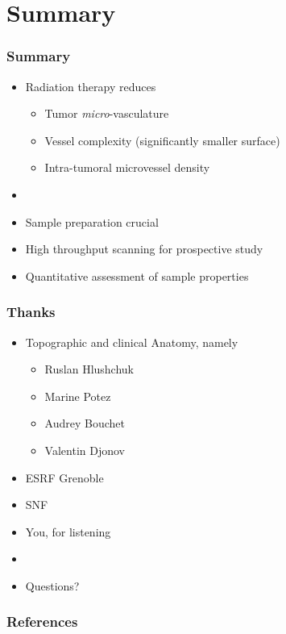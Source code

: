 \documentclass[final]{beamer}
\begin{document}
\section{Summary}
\begin{frame}
	\frametitle{Summary}
	\begin{itemize}
		\item Radiation therapy reduces
		\begin{itemize}
			\item Tumor \emph{micro}-vasculature
			\item Vessel complexity (significantly smaller surface)
			\item Intra-tumoral microvessel density
		\end{itemize}		
		\item[]
		\pause
		\item Sample preparation crucial
		\item High throughput scanning for prospective study
		\item Quantitative assessment of sample properties
	\end{itemize}
\end{frame}

\begin{frame}
	\frametitle{Thanks}
	\begin{itemize}
		\item Topographic and clinical Anatomy, namely
		\begin{itemize}
			\item Ruslan Hlushchuk
			\item Marine Potez
			\item Audrey Bouchet
			\item Valentin Djonov
		\end{itemize}
		\item ESRF Grenoble
		\item SNF
		\pause
		\item You, for listening
		\item[]
		\pause
		\item Questions?
	\end{itemize}
\end{frame}

\begin{frame}
	\frametitle{References}
	\renewcommand*{\bibfont}{\scriptsize}
	\printbibliography
\end{frame}
\end{document}
